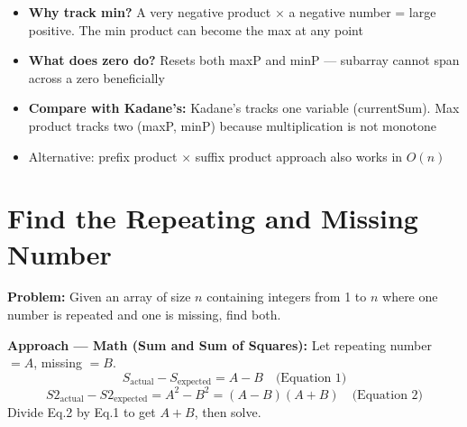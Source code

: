 \documentclass[12pt,a4paper,oneside]{book}
\begin{document}
\begin{interviewcorner}
\begin{itemize}
  \item \textbf{Why track min?} A very negative product $\times$ a negative number = large positive. The min product can become the max at any point
  \item \textbf{What does zero do?} Resets both maxP and minP --- subarray cannot span across a zero beneficially
  \item \textbf{Compare with Kadane's:} Kadane's tracks one variable (currentSum). Max product tracks two (maxP, minP) because multiplication is not monotone
  \item Alternative: prefix product $\times$ suffix product approach also works in $O(n)$
\end{itemize}
\end{interviewcorner}

\section{Find the Repeating and Missing Number}

\textbf{Problem:} Given an array of size $n$ containing integers from 1 to $n$ where one number is repeated and one is missing, find both.

\textbf{Approach --- Math (Sum and Sum of Squares):} Let repeating number $= A$, missing $= B$.
\[
S_{\text{actual}} - S_{\text{expected}} = A - B \quad \text{(Equation 1)}
\]
\[
S2_{\text{actual}} - S2_{\text{expected}} = A^2 - B^2 = (A-B)(A+B) \quad \text{(Equation 2)}
\]
Divide Eq.2 by Eq.1 to get $A + B$, then solve.
\end{document}
